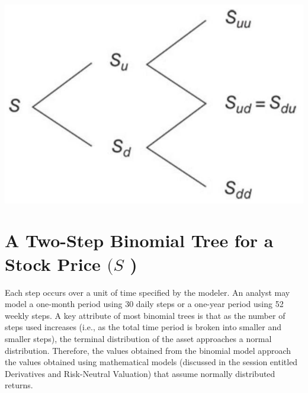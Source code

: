 \documentclass[11pt]{article}
\begin{document}
\begin{center}
\includegraphics[max width=\textwidth]{2024_04_10_859893730bbb41b27826g-2}
\end{center}

\section*{A Two-Step Binomial Tree for a Stock Price $(S$ )}
Each step occurs over a unit of time specified by the modeler. An analyst may model a one-month period using 30 daily steps or a one-year period using 52 weekly steps. A key attribute of most binomial trees is that as the number of steps used increases (i.e., as the total time period is broken into smaller and smaller steps), the terminal distribution of the asset approaches a normal distribution. Therefore, the values obtained from the binomial model approach the values obtained using mathematical models (discussed in the session entitled Derivatives and Risk-Neutral Valuation) that assume normally distributed returns.
\end{document}
